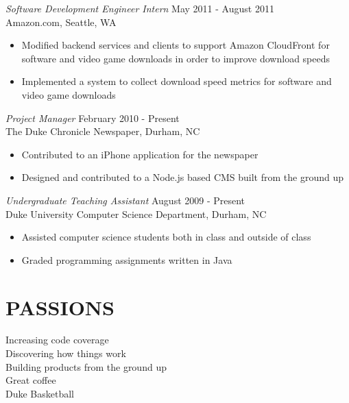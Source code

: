 \documentclass[line,margin]{res}
\begin{document}
\begin{resume}
    {\sl Software Development Engineer Intern} \hfill May 2011 - August 2011 \\
        Amazon.com, Seattle, WA
        \begin{itemize}  \itemsep -2pt %
            \item Modified backend services and clients to support Amazon CloudFront for software and video game downloads in order to improve download speeds
            \item Implemented a system to collect download speed metrics for software and video game downloads
        \end{itemize}

    {\sl Project Manager} \hfill February 2010 - Present \\
        The Duke Chronicle Newspaper, Durham, NC
        \begin{itemize}  \itemsep -2pt %
            \item Contributed to an iPhone application for the newspaper
            \item Designed and contributed to a Node.js based CMS built from the ground up
        \end{itemize}

    {\sl Undergraduate Teaching Assistant} \hfill August 2009 - Present \\
        Duke University Computer Science Department, Durham, NC
        \begin{itemize}  \itemsep -2pt %
            \item Assisted computer science students both in class and outside of class
            \item Graded programming assignments written in Java
        \end{itemize}

\section{PASSIONS}
    Increasing code coverage \\
    Discovering how things work \\
    Building products from the ground up \\
    Great coffee \\
    Duke Basketball
                
\end{resume}
\end{document}
